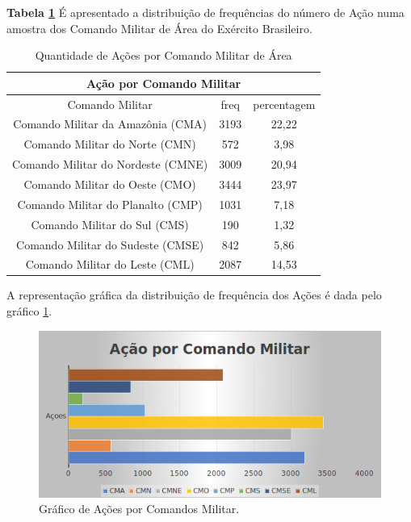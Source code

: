\textbf{Tabela \ref{QuantidadeAcoes}} É apresentado a distribuição de frequências do número de Ação numa amostra dos Comando Militar de Área do Exército Brasileiro. 
\begin{table}[H]
\centering
\begin{tabular}{|c | c| c|} 
 \multicolumn{3}{c}{Ação por Comando Militar}\\ \hline
  Comando Militar & freq   & percentagem \\ [0.5ex] 
 \hline
 Comando Militar da Amazônia (CMA) &  3193 & 22,22\\ 
 \hline
 Comando Militar do Norte (CMN) &  572 & 3,98\\
 \hline
 Comando Militar do Nordeste (CMNE) &  3009 & 20,94\\
 \hline
 Comando Militar do Oeste (CMO) &  3444 & 23,97\\
 \hline
 Comando Militar do Planalto (CMP) &  1031 & 7,18\\
 \hline
 Comando Militar do Sul (CMS) &  190 & 1,32\\
 \hline
 Comando Militar do Sudeste (CMSE) &  842 & 5,86\\
 \hline
 Comando Militar do Leste (CML) &  2087 & 14,53\\ [1ex] 
 \hline
\end{tabular}
\caption{Quantidade de Ações por Comando Militar de Área}
\label{QuantidadeAcoes}
\end{table}

A representação gráfica da distribuição de frequência dos Ações é dada pelo gráfico \ref{figuraAcoes}.
\begin{figure}[H]
        \centering
        \includegraphics[width=1\textwidth]{Figuras/qtde_acoes.png}
        \caption{Gráfico de Ações por Comandos Militar.}
        \label{figuraAcoes}
\end{figure}

